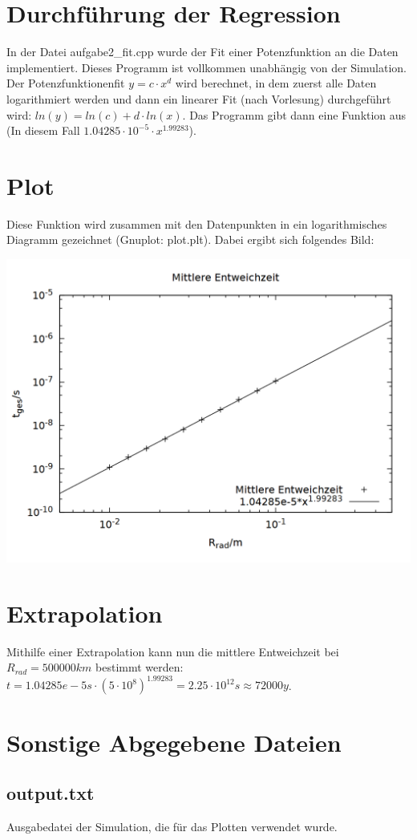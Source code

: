 \documentclass{scrartcl}
\begin{document}
\section{Durchführung der Regression}
In der Datei aufgabe2\_fit.cpp wurde der Fit einer Potenzfunktion an die Daten implementiert. Dieses Programm ist vollkommen unabhängig von der Simulation. Der Potenzfunktionenfit $y = c\cdot x^d$ wird berechnet, in dem zuerst alle Daten logarithmiert werden und dann ein linearer Fit (nach Vorlesung) durchgeführt wird: $ln(y) = ln(c) + d \cdot ln(x)$. Das Programm gibt dann eine Funktion aus (In diesem Fall $1.04285\cdot 10^{-5}\cdot x^{1.99283}$).\\

\section{Plot}
Diese Funktion wird zusammen mit den Datenpunkten in ein logarithmisches Diagramm gezeichnet (Gnuplot: plot.plt). Dabei ergibt sich folgendes Bild:\\

\begin{center}
\includegraphics[scale=0.3]{plot.png}
\end{center}   

\section{Extrapolation}
Mithilfe einer Extrapolation kann nun die mittlere Entweichzeit bei $R_{rad} = 500000km$ bestimmt werden: $t = 1.04285e-5s\cdot (5\cdot 10^8)^{1.99283} = 2.25\cdot 10^{12} s \approx 72000y$. 

\section{Sonstige Abgegebene Dateien}
\subsection{output.txt}
Ausgabedatei der Simulation, die für das Plotten verwendet wurde.
\end{document}
